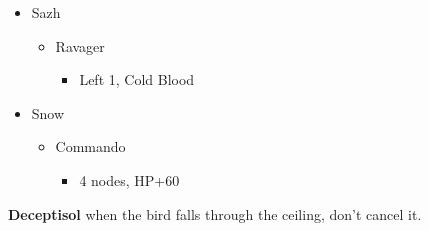\begin{menu}
	\begin{itemize}
		\crystarium
		\begin{itemize}
			\item Sazh
			      \begin{itemize}
				      \item Ravager
				            \begin{itemize}
					            \item Left 1, Cold Blood
				            \end{itemize}
			      \end{itemize}
			\item Snow
			      \begin{itemize}
				      \item Commando
				            \begin{itemize}
					            \item 4 nodes, HP+60
				            \end{itemize}
			      \end{itemize}
		\end{itemize}
	\end{itemize}
\end{menu}
\textbf{Deceptisol} when the bird falls through the ceiling, don't cancel it.

